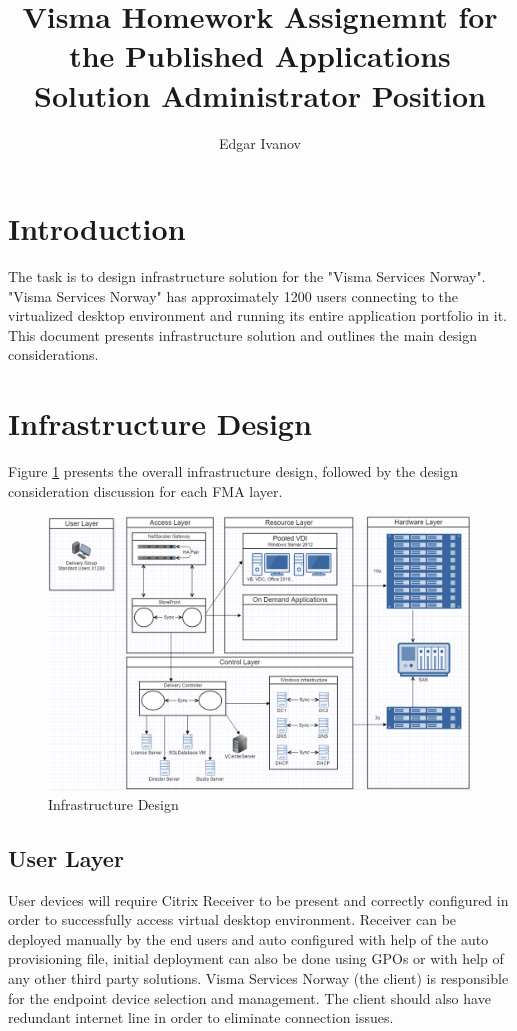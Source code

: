 \documentclass[a4paper]{article}
\title{Visma Homework Assignemnt for the Published Applications Solution Administrator Position}
\author{Edgar Ivanov}
\begin{document}
	\maketitle
	
	\section{Introduction}
	The task is to design infrastructure solution for the "Visma Services Norway". "Visma Services Norway" has approximately 1200 users connecting to the virtualized desktop environment and running its entire application portfolio in it. This document presents infrastructure solution and outlines the main design considerations.
	
	\section{Infrastructure Design}
	Figure \ref{fig:Diagram} presents the overall infrastructure design, followed by the design consideration discussion for each FMA layer.
	
	\begin{figure}
		\centering
		\includegraphics[width=1\textwidth]{InfrastructureDesign.png}
		\caption{\label{fig:Diagram}Infrastructure Design}
	\end{figure}
	
	\subsection{User Layer}
	User devices will require Citrix Receiver to be present and correctly configured in order to successfully access virtual desktop environment. Receiver can be deployed manually by the end users and auto configured with help of the auto provisioning file, initial deployment can also be done using GPOs or with help of any other third party solutions. Visma Services Norway (the client) is responsible for the endpoint device selection and management. The client should also have redundant internet line in order to eliminate connection issues.
\end{document}

